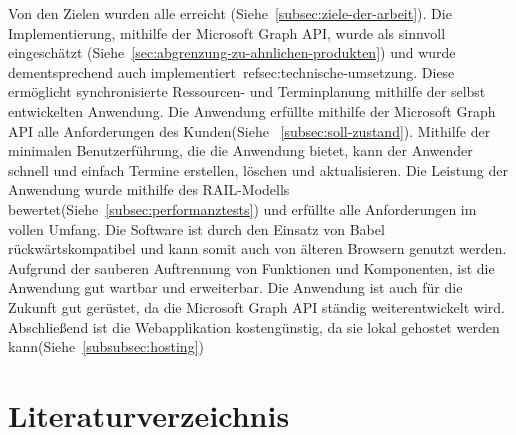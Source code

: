 \newline
\newline
Von den Zielen wurden alle erreicht (Siehe~\ref{subsec:ziele-der-arbeit}).
Die Implementierung, mithilfe der Microsoft Graph API, wurde als sinnvoll eingeschätzt (Siehe~\ref{sec:abgrenzung-zu-ahnlichen-produkten}) und wurde dementsprechend auch implementiert~ref{sec:technische-umsetzung}.
Diese ermöglicht synchronisierte Ressourcen- und Terminplanung mithilfe der selbst entwickelten Anwendung.
Die Anwendung erfüllte mithilfe der Microsoft Graph API alle Anforderungen des Kunden(Siehe ~\ref{subsec:soll-zustand}).
Mithilfe der minimalen Benutzerführung, die die Anwendung bietet, kann der Anwender schnell und einfach Termine erstellen, löschen und aktualisieren.
Die Leistung der Anwendung wurde mithilfe des RAIL-Modells bewertet(Siehe~\ref{subsec:performanztests}) und erfüllte alle Anforderungen im vollen Umfang.
Die Software ist durch den Einsatz von Babel rückwärtskompatibel und kann somit auch von älteren Browsern genutzt werden.
Aufgrund der sauberen Auftrennung von Funktionen und Komponenten, ist die Anwendung gut wartbar und erweiterbar.
Die Anwendung ist auch für die Zukunft gut gerüstet, da die Microsoft Graph API ständig weiterentwickelt wird.
Abschließend ist die Webapplikation kostengünstig, da sie lokal gehostet werden kann(Siehe~\ref{subsubsec:hosting})

\newline
\newline
\justifying
\newpage
\section{Literaturverzeichnis}\label{sec:literaturverzeichnis}